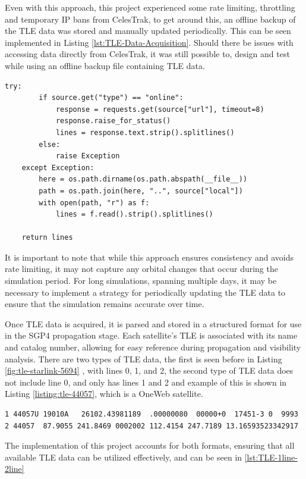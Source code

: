 Even with this approach, this project experienced some rate limiting, throttling and temporary IP bans from CelesTrak, to get around this, an offline backup of the TLE data was stored and manually updated periodically. This can be seen implemented in Listing \ref{lst:TLE-Data-Acquisition}. Should there be issues with accessing data directly from CelesTrak, it was still possible to, design and test while using an offline backup file containing TLE data.

\begin{lstlisting}[caption={TLE data acquisition logic}, label={lst:TLE-Data-Acquisition}]
        try:
        if source.get("type") == "online":
            response = requests.get(source["url"], timeout=8)
            response.raise_for_status()
            lines = response.text.strip().splitlines()
        else:
            raise Exception
    except Exception:
        here = os.path.dirname(os.path.abspath(__file__))
        path = os.path.join(here, "..", source["local"])
        with open(path, "r") as f:
            lines = f.read().strip().splitlines()

    return lines
\end{lstlisting}


It is important to note that while this approach ensures consistency and avoids rate limiting, it may not capture any orbital changes that occur during the simulation period. For long simulations, spanning multiple days, it may be necessary to implement a strategy for periodically updating the TLE data to ensure that the simulation remains accurate over time.

Once TLE data is acquired, it is parsed and stored in a structured format for use in the SGP4 propagation stage. Each satellite's TLE is associated with its name and catalog number, allowing for easy reference during propagation and visibility analysis. There are two types of TLE data, the first is seen before in Listing \ref{fig:tle-starlink-5694} , with lines 0, 1, and 2, the second type of TLE data does not include line 0, and only has lines 1 and 2 and example of this is shown in Listing \ref{listing:tle-44057}, which is a OneWeb satellite. 
\begin{lstlisting}[caption={Two-Line Element (TLE) for SATELLITE-44057}, label={listing:tle-44057}]
1 44057U 19010A   26102.43981189  .00000080  00000+0  17451-3 0  9993
2 44057  87.9055 241.8469 0002002 112.4154 247.7189 13.16593523342917
\end{lstlisting}

The implementation of this project accounts for both formats, ensuring that all available TLE data can be utilized effectively, and can be seen in \ref{lst:TLE-1line-2line}

